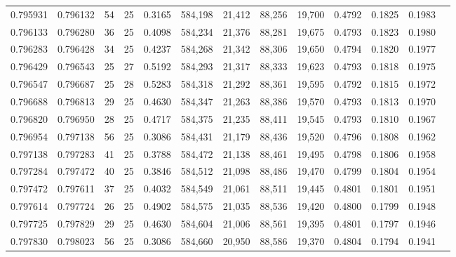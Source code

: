 \begin{tabular}{rrrrrrrrrrrrr}
0.795931 & 0.796132 &    54 &  25 &                                     0.3165 & 584,198 &  21,412 &  88,256 &  19,700 & 0.4792 & 0.1825 & 0.1983 \\
0.796133 & 0.796280 &    36 &  25 &                                     0.4098 & 584,234 &  21,376 &  88,281 &  19,675 & 0.4793 & 0.1823 & 0.1980 \\
0.796283 & 0.796428 &    34 &  25 &                                     0.4237 & 584,268 &  21,342 &  88,306 &  19,650 & 0.4794 & 0.1820 & 0.1977 \\
0.796429 & 0.796543 &    25 &  27 &                                     0.5192 & 584,293 &  21,317 &  88,333 &  19,623 & 0.4793 & 0.1818 & 0.1975 \\
0.796547 & 0.796687 &    25 &  28 &                                     0.5283 & 584,318 &  21,292 &  88,361 &  19,595 & 0.4792 & 0.1815 & 0.1972 \\
0.796688 & 0.796813 &    29 &  25 &                                     0.4630 & 584,347 &  21,263 &  88,386 &  19,570 & 0.4793 & 0.1813 & 0.1970 \\
0.796820 & 0.796950 &    28 &  25 &                                     0.4717 & 584,375 &  21,235 &  88,411 &  19,545 & 0.4793 & 0.1810 & 0.1967 \\
0.796954 & 0.797138 &    56 &  25 &                                     0.3086 & 584,431 &  21,179 &  88,436 &  19,520 & 0.4796 & 0.1808 & 0.1962 \\
0.797138 & 0.797283 &    41 &  25 &                                     0.3788 & 584,472 &  21,138 &  88,461 &  19,495 & 0.4798 & 0.1806 & 0.1958 \\
0.797284 & 0.797472 &    40 &  25 &                                     0.3846 & 584,512 &  21,098 &  88,486 &  19,470 & 0.4799 & 0.1804 & 0.1954 \\
0.797472 & 0.797611 &    37 &  25 &                                     0.4032 & 584,549 &  21,061 &  88,511 &  19,445 & 0.4801 & 0.1801 & 0.1951 \\
0.797614 & 0.797724 &    26 &  25 &                                     0.4902 & 584,575 &  21,035 &  88,536 &  19,420 & 0.4800 & 0.1799 & 0.1948 \\
0.797725 & 0.797829 &    29 &  25 &                                     0.4630 & 584,604 &  21,006 &  88,561 &  19,395 & 0.4801 & 0.1797 & 0.1946 \\
0.797830 & 0.798023 &    56 &  25 &                                     0.3086 & 584,660 &  20,950 &  88,586 &  19,370 & 0.4804 & 0.1794 & 0.1941 \\

\end{tabular}
